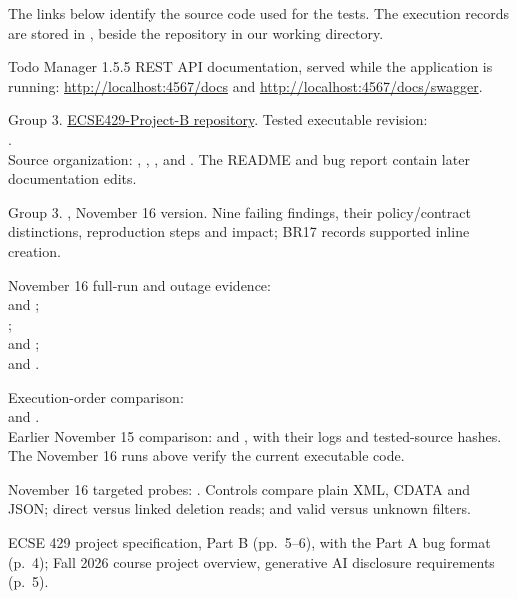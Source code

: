 The links below identify the source code used for the tests. The execution
records are stored in , beside the repository
in our working directory.

\begin{enumerate}[label={[\arabic*]},ref=\arabic*,leftmargin=2em,itemsep=8bp,topsep=6bp]
\item\label{ref:api} Todo Manager 1.5.5 REST API documentation, served while the application is running: \url{http://localhost:4567/docs} and \url{http://localhost:4567/docs/swagger}.
\item\label{ref:source} Group 3. \href{https://github.com/james-helou/ECSE429-Project-B}{ECSE429-Project-B repository}. Tested executable revision:\\
.\\
Source organization: \href{https://github.com/james-helou/ECSE429-Project-B/tree/e404151581db239870832037758d61221c01e61a/features}{}, \href{https://github.com/james-helou/ECSE429-Project-B/tree/e404151581db239870832037758d61221c01e61a/steps}{}, , and . The README and bug report contain later documentation edits.
\item\label{ref:bugs} Group 3. , November 16 version. Nine failing findings, their policy/contract distinctions, reproduction steps and impact; BR17 records supported inline creation.
\item\label{ref:finalrun} November 16 full-run and outage evidence:\\
 and ;\\
;\\
 and ;\\
 and .
\item\label{ref:orders} Execution-order comparison:\\
 and .\\
Earlier November 15 comparison:  and , with their logs and tested-source hashes. The November 16 runs above verify the current executable code.
\item\label{ref:probes} November 16 targeted probes: . Controls compare plain XML, CDATA and JSON; direct versus linked deletion reads; and valid versus unknown filters.
\item\label{ref:assignment} ECSE 429 project specification, Part B (pp.~5--6), with the Part A bug format (p.~4); Fall 2026 course project overview, generative AI disclosure requirements (p.~5).
\end{enumerate}

